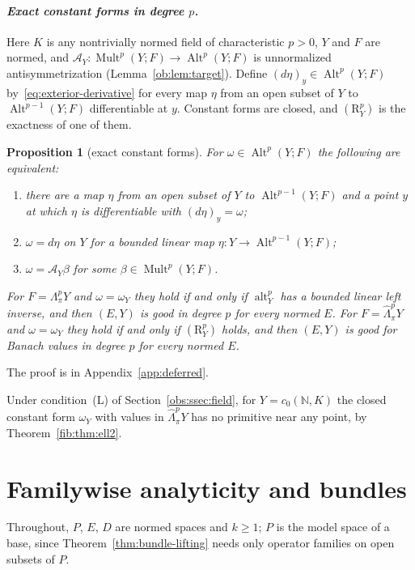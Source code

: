 \documentclass[11pt]{amsart}
\newtheorem{proposition}[theorem]{Proposition}
\theoremstyle{definition}
\theoremstyle{remark}
\numberwithin{equation}{section}
\newcommand{\N}{\mathbb N}
\newcommand{\Alt}{\operatorname{Alt}}
\newcommand{\Mult}{\operatorname{Mult}}
\theoremstyle{plain}
\theoremstyle{definition}
\theoremstyle{plain}
\begin{document}
\paragraph{\textit{Exact constant forms in degree $p$.}}
Here $K$ is any nontrivially normed field of characteristic $p>0$, $Y$ and $F$ are normed, and $\mathcal A_Y\colon\Mult^p(Y;F)\to\Alt^p(Y;F)$ is unnormalized antisymmetrization (Lemma~\ref{ob:lem:target}). Define $(d\eta)_y\in\Alt^p(Y;F)$ by~\eqref{eq:exterior-derivative} for every map $\eta$ from an open subset of $Y$ to $\Alt^{p-1}(Y;F)$ differentiable at $y$. Constant forms are closed, and $(\mathrm R^p_Y)$ is the exactness of one of them.
\begin{proposition}[exact constant forms]\label{fib:prop:derham}
For $\omega\in\Alt^p(Y;F)$ the following are equivalent:
\begin{enumerate}
\item there are a map $\eta$ from an open subset of $Y$ to $\Alt^{p-1}(Y;F)$ and a point $y$ at which $\eta$ is
differentiable with $(d\eta)_y=\omega$;
\item $\omega=d\eta$ on $Y$ for a bounded linear map $\eta\colon Y\to\Alt^{p-1}(Y;F)$;
\item $\omega=\mathcal A_Y\beta$ for some $\beta\in\Mult^p(Y;F)$.
\end{enumerate}
For $F=\Lambda^p_\pi Y$ and $\omega=\omega_Y$ they hold if and only if $\operatorname{alt}^p_Y$ has a bounded linear left
inverse, and then $(E,Y)$ is good in degree $p$ for every normed $E$. For $F=\widehat\Lambda^p_\pi Y$ and
$\omega=\omega_Y$ they hold if and only if $(\mathrm R^p_Y)$ holds, and then $(E,Y)$ is good for Banach values in degree
$p$ for every normed $E$.
\end{proposition}

The proof is in Appendix~\ref{app:deferred}.

Under condition~\textup{(L)} of Section~\ref{obs:ssec:field}, for $Y=c_0(\N,K)$ the closed constant form $\omega_Y$ with values in $\widehat\Lambda^p_\pi Y$ has no primitive near any point, by Theorem~\ref{fib:thm:ell2}.
\section{Familywise analyticity and bundles}\label{sec:families}

Throughout, $P$, $E$, $D$ are normed spaces and $k\ge1$; $P$ is the model space of a base, since
Theorem~\ref{thm:bundle-lifting} needs only operator families on open subsets of $P$.
\end{document}
